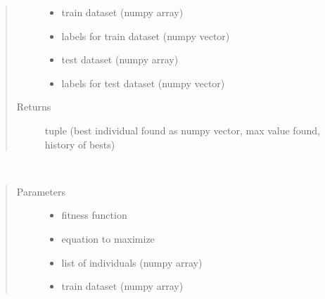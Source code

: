 \documentclass[letterpaper,10pt,english]{sphinxmanual}
\begin{document}
\begin{fulllineitems}
\begin{fulllineitems}
\begin{quote}
\begin{description}
\begin{itemize}
\item {} 
 \textendash{} train dataset (numpy array)

\item {} 
 \textendash{} labels for train dataset (numpy vector)

\item {} 
 \textendash{} test dataset (numpy array)

\item {} 
 \textendash{} labels for test dataset (numpy vector)

\end{itemize}

\item[{Returns}] \leavevmode
tuple (best individual found as numpy vector, max value found, history of bests)

\end{description}\end{quote}

\end{fulllineitems}


\begin{fulllineitems}
\label{\detokenize{index:genetic_optimizer.GeneticRegularizator.best_of_generation}}~\begin{quote}\begin{description}
\item[{Parameters}] \leavevmode\begin{itemize}
\item {} 
 \textendash{} fitness function

\item {} 
 \textendash{} equation to maximize

\item {} 
 \textendash{} list of individuals (numpy array)

\item {} 
 \textendash{} train dataset (numpy array)


\end{itemize}
\end{description}
\end{quote}
\end{fulllineitems}
\end{fulllineitems}
\end{document}
